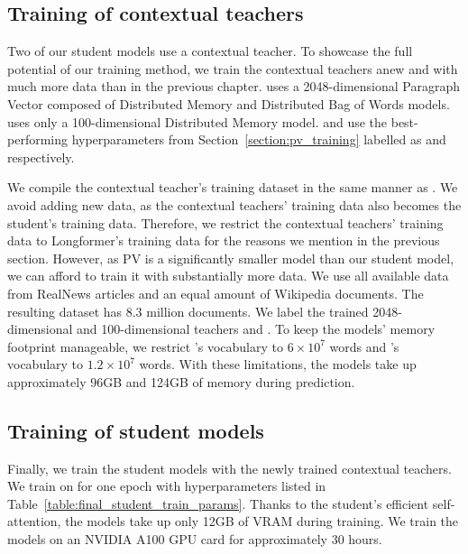 \subsection{Training of contextual teachers}

Two of our student models use a contextual teacher. To showcase the full
potential of our training method, we train the contextual teachers anew and
with much more data than in the previous chapter. {\CosineStudent} uses a
2048-dimensional Paragraph Vector \citep{le2014distributed} composed of
Distributed Memory and Distributed Bag of Words models. {\MSEStudent} uses only
a 100-dimensional Distributed Memory model. {\CosineStudent} and {\MSEStudent}
use the best-performing hyperparameters from Section~\ref{section:pv_training}
labelled as  and  respectively.

We compile the contextual teacher's training dataset in the same manner as
. We avoid adding new data, as the contextual teachers' training
data also becomes the student's training data. Therefore, we restrict the
contextual teachers' training data to Longformer's training data for the
reasons we mention in the previous section. However, as PV is a significantly
smaller model than our student model, we can afford to train it with
substantially more data. We use all available data from RealNews articles and
an equal amount of Wikipedia documents. The resulting dataset has 8.3 million
documents. We label the trained 2048-dimensional and 100-dimensional teachers
 and . To keep the models' memory footprint manageable, we
restrict 's vocabulary to $6\times 10^7$ words and 's
vocabulary to $1.2\times 10^7$ words. With these limitations, the models take
up approximately 96GB and 124GB of memory during prediction.

\subsection{Training of student models}

Finally, we train the student models with the newly trained contextual teachers.
We train on  for one epoch with hyperparameters listed in
Table~\ref{table:final_student_train_params}. Thanks to the student's efficient
self-attention, the models take up only 12GB of VRAM during training. We train
the models on an NVIDIA A100 GPU card for approximately 30 hours.

